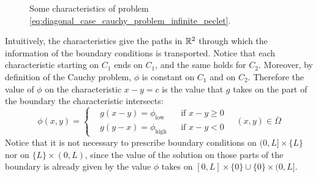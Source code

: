 \begin{figure}[h]
	\centering
	\caption{Some characteristics of problem \eqref{eq:diagonal_case_cauchy_problem_infinite_peclet}.}
	\label{fig:diagonal_case_cauchy_problem_infinite_peclet_characteristics_problem}
\end{figure}

\noindent
Intuitively, the characteristics give the paths in $\mathbb{R}^2$ through which the information of the boundary conditions is transported. Notice that each characteristic starting on $C_1$ ends on $C_1$, and the same holds for $C_2$. Moreover, by definition of the Cauchy problem, $\phi$ is constant on $C_1$ and on $C_2$. Therefore the value of $\phi$ on the characteristic $x - y = c$ is the value that $g$ takes on the part of the boundary the characteristic intersects:
\begin{equation} \label{eq:diagonal_case_cauchy_problem_infinite_peclet_solution}
	\phi(x,y) = 
	\left\{
	\begin{aligned}
		&g(x-y) = \phi_\text{low} 	& &\text{if } x - y \geq 0 \\
		&g(y-x) = \phi_\text{high} 	& &\text{if } x - y < 0
	\end{aligned}
	\right.
	\quad
	(x, y) \in \overline{\Omega}
\end{equation}
Notice that it is not necessary to prescribe boundary conditions on $(0, L] \times \{ L \}$ nor on $\{ L \} \times (0, L)$, since the value of the solution on those parts of the boundary is already given by the value $\phi$ takes on $[0, L] \times \{ 0 \} \cup \{ 0 \} \times (0, L]$.


